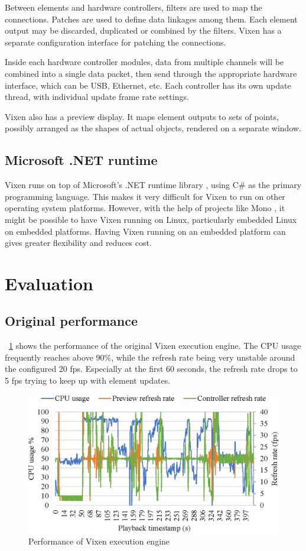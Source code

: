 \documentclass[journal]{IEEEtran}
\newcommand{\fref}[1]{\figurename~\ref{#1}}
\begin{document}
Between elements and hardware controllers, filters are used to map the connections. Patches are used to define data linkages among them. Each element output may be discarded, duplicated or combined by the filters. Vixen has a separate configuration interface for patching the connections.

Inside each hardware controller modules, data from multiple channels will be combined into a single data packet, then send through the appropriate hardware interface, which can be USB, Ethernet, etc. Each controller has its own update thread, with individual update frame rate settings.

Vixen also has a preview display. It maps element outputs to sets of points, possibly arranged as the shapes of actual objects, rendered on a separate window.

\subsection{Microsoft .NET runtime}

Vixen runs on top of Microsoft's .NET runtime library \cite{platt2002introducing}, using C\# \cite{hejlsberg2003c} as the primary programming language. This makes it very difficult for Vixen to run on other operating system platforms. However, with the help of projects like Mono \cite{de2004mono}, it might be possible to have Vixen running on Linux, particularly embedded Linux on embedded platforms. Having Vixen running on an embedded platform can gives greater flexibility and reduces cost.

\section{Evaluation}

\subsection{Original performance}

\fref{fig:original} shows the performance of the original Vixen execution engine. The CPU usage frequently reaches above $90 \%$, while the refresh rate being very unstable around the configured 20 fps. Especially at the first 60 seconds, the refresh rate drops to 5 fps trying to keep up with element updates.

\begin{figure}[t]
    \centering
    \includegraphics[width=0.8\columnwidth]{original}
    \caption{Performance of Vixen execution engine}
    \label{fig:original}
\end{figure}
\end{document}

